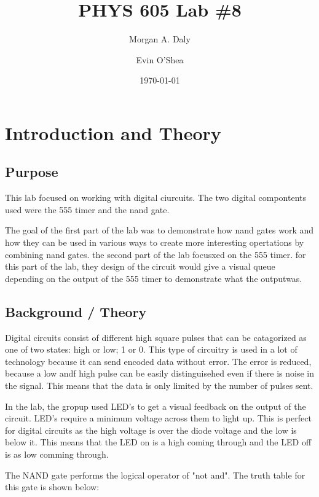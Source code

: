 \documentclass[twocolumn, amsmath]{revtex4}
\begin{document}
\title{PHYS 605 Lab \#8} 

\author{Morgan A. Daly}
\author{Evin O'Shea}
\date{\today} 


\maketitle


\section{Introduction and Theory}
\subsection{Purpose}

This lab focused on working with digital ciurcuits. The two digital compontents used were the 555 timer and the nand gate. 

The goal of the first part of the lab was to demonstrate how nand gates work and how they can be used in various ways to create more interesting opertations by combining nand gates. 
the second part of the lab focusxed on the 555 timer. for this part of the lab, they design of the circuit would give a visual queue depending on the output of the 555 timer to demonstrate what the outputwas.



\subsection{Background / Theory}



Digital circuits consist of different high square pulses that can be catagorized as one of two states: high or low; 1 or 0. This type of circuitry is used in a lot of technology because it can send encoded data without error. The error is reduced, because a low andf high pulse can be easily distinguisehed even if there is noise in the signal. This means that the data is only limited by the number of pulses sent.

In the lab, the gropup used LED's to get a visual feedback on the output of the circuit. 
LED's require a minimum voltage across them to light up. This is perfect for digital circuits as the high voltage is over the diode voltage and the low is below it. This means that the LED on is a high coming through and the LED off is as low comming through.

The NAND gate performs the logical operator of "not and". The truth table for this gate is shown below:
\end{document}
